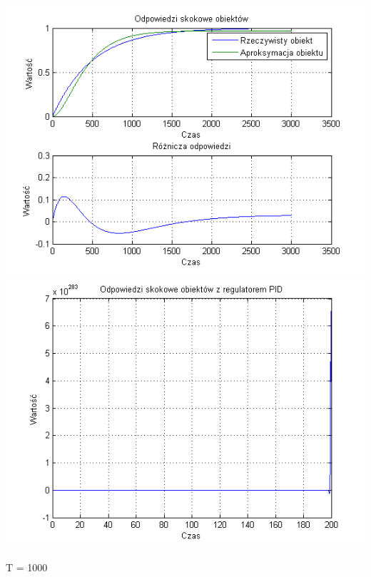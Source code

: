 \documentclass[10pt,a4paper]{article}
\begin{document}
\begin{center}
\includegraphics[scale=1]{images/dwa/skrypt_39.png}\\
\includegraphics[scale=1]{images/dwa/skrypt_40.png}\\
\end{center}
\newpage
T = 1000
\end{document}
